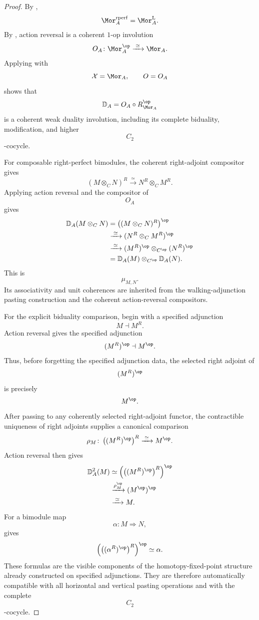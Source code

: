 \begin{proof}
By
,
\[
    \Mor_A^{\mathrm{rperf}}
    =
    \Mor_A^{\mathrm L}.
\]
By
, action reversal is a coherent
$1$-op involution
\[
    O_A
    \colon
    \Mor_A^{\op}
    \xrightarrow{\;\simeq\;}
    \Mor_A.
\]
Applying
 with
\[
    \mathcal X
    =
    \Mor_A,
    \qquad
    O
    =
    O_A
\]
shows that
\[
    \mathbb D_A
    =
    O_A\circ R_{\Mor_A}^{\op}
\]
is a coherent weak duality involution, including its complete
biduality, modification, and higher
\[
    C_2
\]
-cocycle.

For composable right-perfect bimodules, the coherent right-adjoint
compositor gives
\[
    (M\otimes_C N)^R
    \xrightarrow{\;\simeq\;}
    N^R\otimes_C M^R.
\]
Applying action reversal and the compositor of
\[
    O_A
\]
gives
\[
\begin{aligned}
    \mathbb D_A(M\otimes_C N)
    &=
    \bigl(
        (M\otimes_C N)^R
    \bigr)^{\op}
    \\
    &\xrightarrow{\;\simeq\;}
    (N^R\otimes_C M^R)^{\op}
    \\
    &\xrightarrow{\;\simeq\;}
    (M^R)^{\op}
    \otimes_{C^{\op}}
    (N^R)^{\op}
    \\
    &=
    \mathbb D_A(M)
    \otimes_{C^{\op}}
    \mathbb D_A(N).
\end{aligned}
\]
This is
\[
    \mu_{M,N}.
\]
Its associativity and unit coherences are inherited from the
walking-adjunction pasting construction and the coherent action-reversal
compositors.

For the explicit biduality comparison, begin with a specified adjunction
\[
    M\dashv M^R.
\]
Action reversal gives the specified adjunction
\[
    (M^R)^{\op}
    \dashv
    M^{\op}.
\]
Thus, before forgetting the specified adjunction data, the selected right
adjoint of
\[
    (M^R)^{\op}
\]
is precisely
\[
    M^{\op}.
\]
After passing to any coherently selected right-adjoint functor, the
contractible uniqueness of right adjoints supplies a canonical
comparison
\[
    \rho_M
    \colon
    \left(
        (M^R)^{\op}
    \right)^R
    \xrightarrow{\;\simeq\;}
    M^{\op}.
\]
Action reversal then gives
\[
\begin{aligned}
    \mathbb D_A^2(M)
    &\simeq
    \left(
        \left(
            (M^R)^{\op}
        \right)^R
    \right)^{\op}
    \\
    &\xrightarrow{\rho_M^{\op}}
    (M^{\op})^{\op}
    \\
    &\xrightarrow{\;\simeq\;}
    M.
\end{aligned}
\]
For a bimodule map
\[
    \alpha
    \colon
    M
    \Longrightarrow
    N,
\]
 gives
\[
    \left(
        \left(
            (\alpha^R)^{\op}
        \right)^R
    \right)^{\op}
    \simeq
    \alpha.
\]
These formulas are the visible components of the homotopy-fixed-point
structure already constructed on specified adjunctions. They are
therefore automatically compatible with all horizontal and vertical
pasting operations and with the complete
\[
    C_2
\]
-cocycle.
\end{proof}

